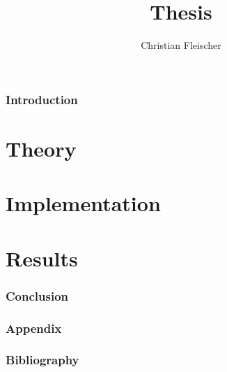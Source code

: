 \documentclass[11pt,a4wide]{article}
\title{Thesis}
\author{Christian Fleischer}
\date{ }
\numberwithin{equation}{section}
\begin{document}
 
\maketitle
 
\section{Introduction}

 

\part{Theory} 

 
\part{Implementation}


\part{Results}


\section{Conclusion}


\section{Appendix}


\section{Bibliography}

 
\end{document}
